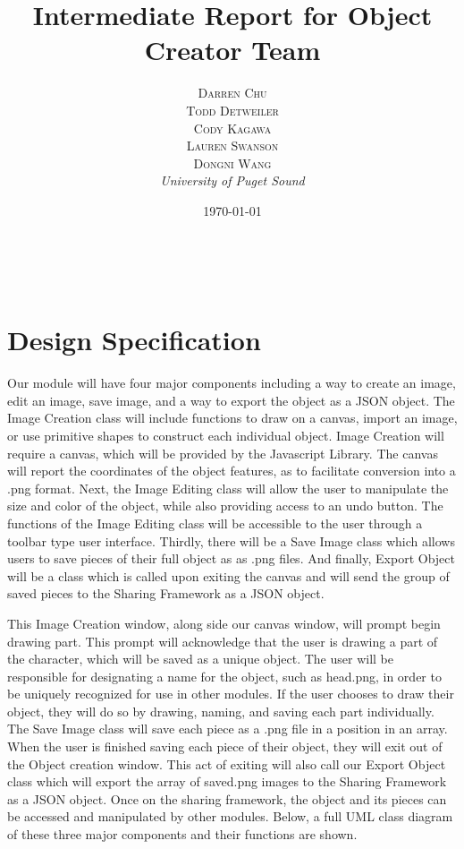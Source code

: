 \documentclass[a4paper, 11pt]{article} %
\title{\textbf{Intermediate Report for Object Creator Team}}
\author{\textsc{Darren Chu\\Todd Detweiler\\Cody Kagawa\\Lauren Swanson\\Dongni Wang} %
\\{\textit{University of Puget Sound}}} %
\date{\today} %
\makeatletter
\renewcommand{\maketitle}{ %
\begin{flushright} %
{\LARGE\@title} %

\vspace{50pt} %

{\large\@author} %
\\\@date %

\vspace{40pt} %
\end{flushright}
}
\makeatother
\begin{document}
\maketitle %


\section*{Design Specification}

Our module will have four major components including a way to create an image, edit an image, save image, and a way to export the object as a JSON object. The Image Creation class will include functions to draw on a canvas, import an image, or use primitive shapes to construct each individual object. Image Creation will require a canvas, which will be provided by the Javascript Library. The canvas will report the coordinates of the object features, as to facilitate conversion into a .png format. Next, the Image Editing class will allow the user to manipulate the size and color of the object, while also providing access to an undo button. The functions of the Image Editing class will be accessible to the user through a toolbar type user interface. Thirdly, there will be a Save Image class which allows users to save pieces of their full object as as .png files. And finally, Export Object will be a class which is called upon exiting the canvas and will send the group of saved pieces to the Sharing Framework as a JSON object.

This Image Creation window, along side our canvas window, will prompt begin drawing part. This prompt will acknowledge that the user is drawing a part of the character, which will be saved as a unique object. The user will be responsible for designating a name for the object, such as head.png, in order to be uniquely recognized for use in other modules. If the user chooses to draw their object, they will do so by drawing, naming, and saving each part individually. The Save Image class will save each piece as a .png file in a position in an array. When the user is finished saving each piece of their object, they will exit out of the Object creation window. This act of exiting will also call our Export Object class which will export the array of saved.png images to the Sharing Framework as a JSON object. Once on the sharing framework, the object and its pieces can be accessed and manipulated by other modules. Below, a full UML class diagram of these three major components and their functions are shown.
\end{document}

